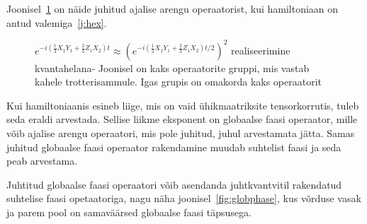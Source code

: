 \documentclass[12pt]{report}
\def\paren#1{\left(#1\right)}
\begin{document}
Joonisel~\ref{fig:trotexctrl} on näide juhitud ajalise arengu operaatorist, kui hamiltoniaan on antud valemiga~\eqref{j:hex}.

\begin{figure}
    \centering
    \ifdefined\yquanton
    \fi
    \caption{\(e^{-i\paren{\frac{1}{3}X_1Y_1+\frac{2}{3}Z_1X_2} t} \approx \paren{e^{-i\paren{\frac{1}{3}X_1Y_1+\frac{2}{3}Z_1X_2} t/2}}^2\) realiseerimine kvantahelana-
    Joonisel on kaks operaatorite gruppi, mis vastab kahele trotterisammule.
    Igas grupis on omakorda kaks operaatorit}
    \label{fig:trotexctrl}
\end{figure}

Kui hamiltoniaanis esineb liige, mis on vaid ühikmaatriksite tensorkorrutis, tuleb seda eraldi arvestada.
Sellise liikme eksponent on globaalse faasi operaator, mille võib ajalise arengu operaatori, mis pole juhitud, juhul arvestamata jätta.
Samas juhitud globaalse faasi operaator rakendamine muudab suhtelist faasi ja seda peab arvestama.

Juhtitud globaalse faasi operaatori võib asendanda juhtkvantvitil rakendatud suhtelise faasi opetaatoriga, nagu näha joonisel~\ref{fig:globphase}, kus võrduse vasak ja parem pool on samaväärsed globaalse faasi täpsusega.
\end{document}
